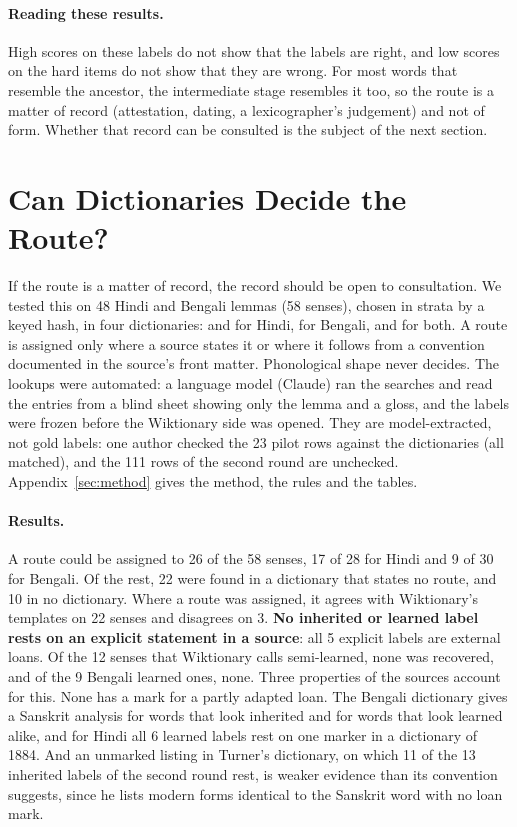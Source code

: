 \documentclass[11pt]{article}
\begin{document}
\paragraph{Reading these results.} High scores on these labels do not show that the labels are right, and low scores on the hard items do not show that they are wrong. For most words that resemble the ancestor, the intermediate stage resembles it too, so the route is a matter of record (attestation, dating, a lexicographer's judgement) and not of form. Whether that record can be consulted is the subject of the next section.

\section{Can Dictionaries Decide the Route?}
\label{sec:why}

If the route is a matter of record, the record should be open to consultation. We tested this on 48 Hindi and Bengali lemmas (58 senses), chosen in strata by a keyed hash, in four dictionaries: \citet{platts1884} and \citet{dasa1975sabdasagara} for Hindi, \citet{dasa1937bangala} for Bengali, and \citet{turner1966cdial} for both. A route is assigned only where a source states it or where it follows from a convention documented in the source's front matter. Phonological shape never decides. The lookups were automated: a language model (Claude) ran the searches and read the entries from a blind sheet showing only the lemma and a gloss, and the labels were frozen before the Wiktionary side was opened. They are model-extracted, not gold labels: one author checked the 23 pilot rows against the dictionaries (all matched), and the 111 rows of the second round are unchecked. Appendix~\ref{sec:method} gives the method, the rules and the tables.

\paragraph{Results.} A route could be assigned to 26 of the 58 senses, 17 of 28 for Hindi and 9 of 30 for Bengali. Of the rest, 22 were found in a dictionary that states no route, and 10 in no dictionary. Where a route was assigned, it agrees with Wiktionary's templates on 22 senses and disagrees on 3. \textbf{No inherited or learned label rests on an explicit statement in a source}: all 5 explicit labels are external loans. Of the 12 senses that Wiktionary calls semi-learned, none was recovered, and of the 9 Bengali learned ones, none. Three properties of the sources account for this. None has a mark for a partly adapted loan. The Bengali dictionary gives a Sanskrit analysis for words that look inherited and for words that look learned alike, and for Hindi all 6 learned labels rest on one marker in a dictionary of 1884. And an unmarked listing in Turner's dictionary, on which 11 of the 13 inherited labels of the second round rest, is weaker evidence than its convention suggests, since he lists modern forms identical to the Sanskrit word with no loan mark.
\end{document}
